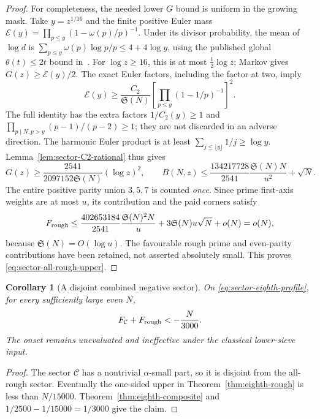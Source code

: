 \documentclass[11pt,a4paper]{article}
\newtheorem{corollary}[theorem]{Corollary}
\theoremstyle{definition}
\theoremstyle{remark}
\begin{document}
\begin{proof}
For completeness, the needed lower $G$ bound is uniform in the
growing mask.  Take $y=z^{1/16}$ and the finite positive Euler
mass $\mathcal E(y)=\prod_{p\leq y}(1-\omega(p)/p)^{-1}$.
Under its divisor probability, the mean of $\log d$ is
$\sum_{p\leq y}\omega(p)\log p/p\leq4+4\log y$,
using the published global $\theta(t)\leq2t$ bound in~\cite{AH}.
For $\log z\geq16$, this is at most $\tfrac12\log z$;
Markov gives $G(z)\geq\mathcal E(y)/2$.
The exact Euler factors, including the factor at two, imply
\[
 \mathcal E(y)\geq\frac{C_2}{\mathfrak S(N)}
             \left[\prod_{p\leq y}(1-1/p)^{-1}\right]^2.
\]
The full identity has the extra factors $1/C_2(y)\geq1$
and $\prod_{p\mid N,p>y}(p-1)/(p-2)\geq1$; they are not
discarded in an adverse direction.  The harmonic Euler product
is at least $\sum_{j\leq\lfloor y\rfloor}1/j\geq\log y$.
Lemma~\ref{lem:sector-C2-rational} thus gives
\[
 G(z)\geq\frac{2541}{2097152\mathfrak S(N)}(\log z)^2,
 \qquad
 B(N,z)\leq\frac{134217728}{2541}
                  \frac{\mathfrak S(N)N}{u^2}+\sqrt N.
\]
The entire positive parity union $3,5,7$ is counted \emph{once}.
Since prime first-axis weights are at most $u$, its contribution
and the paid corners satisfy
\[
 F_{\rm rough}\leq\frac{402653184}{2541}
                \frac{\mathfrak S(N)^2N}{u}
              +3\mathfrak S(N)u\sqrt N+o(N)=o(N),
\]
because $\mathfrak S(N)=O(\log u)$.  The favourable rough
prime and even-parity contributions have been retained, not
asserted absolutely small.  This proves
\eqref{eq:sector-all-rough-upper}.
\end{proof}

\begin{corollary}[A disjoint combined negative sector]
\label{cor:eighth-combined}
On \eqref{eq:sector-eighth-profile}, for every sufficiently
large even $N$,
\begin{equation}
                     F_{\mathcal C}+F_{\rm rough}< -\frac N{3000}.
 \label{eq:sector-combined-credit}
\end{equation}
The onset remains unevaluated and ineffective under the
classical lower-sieve input.
\end{corollary}
\begin{proof}
The sector $\mathcal C$ has a nontrivial $\alpha$-small part,
so it is disjoint from the all-rough sector.  Eventually the
one-sided upper in Theorem~\ref{thm:eighth-rough} is less than
$N/15000$.  Theorem~\ref{thm:eighth-composite} and
$1/2500-1/15000=1/3000$ give the claim.
\end{proof}
\end{document}

